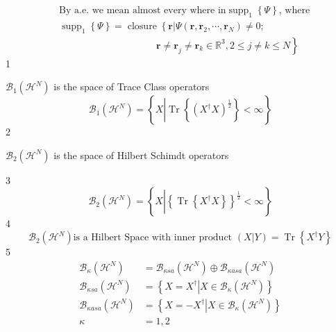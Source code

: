 \documentclass[prl,twocolumn]{revtex4}%
\begin{document}
%

\begin{align*}
&  \text{By a.e. we mean almost every where in}\operatorname*{supp}%
\nolimits_{1}\left\{  \Psi\right\}  \text{, where}\\
&  \operatorname*{supp}\nolimits_{1}\left\{  \Psi\right\}
=\operatorname*{closure}\left\{  \mathbf{r}\left\vert \Psi\left(
\mathbf{r},\mathbf{r}_{2},\cdots,\mathbf{r}_{N}\right)  \neq0;\right.
\right.  \\
&  \qquad\qquad\qquad\qquad\qquad\left.  \mathbf{r\neq r}_{j}\neq
\mathbf{r}_{k}\in\mathbb{R}^{3},2\leq j\neq k\leq N\right\}
\end{align*}
1

$\mathcal{B}_{1}\left(  \mathcal{H}^{N}\right)  $ is the space of Trace Class
operators
\[
\mathcal{B}_{1}\left(  \mathcal{H}^{N}\right)  =\left\{  X\left\vert
\operatorname{Tr}\left\{  \left(  X^{\dagger}X\right)  ^{\frac{1}{2}}\right\}
<\infty\right.  \right\}
\]
2

$\mathcal{B}_{2}\left(  \mathcal{H}^{N}\right)  $ is the space of Hilbert
Schimdt operators

3%
\[
\mathcal{B}_{2}\left(  \mathcal{H}^{N}\right)  =\left\{  X\left\vert \left\{
\operatorname{Tr}\left\{  X^{\dagger}X\right\}  \right\}  ^{\frac{1}{2}%
}<\infty\right.  \right\}
\]
4%
\[
\mathcal{B}_{2}\left(  \mathcal{H}^{N}\right)  \text{is a Hilbert Space with
inner product }\left(  X\left\vert Y\right.  \right)  =\operatorname{Tr}%
\left\{  X^{\dagger}Y\right\}
\]
5%
\begin{align*}
\mathcal{B}_{\kappa}\left(  \mathcal{H}^{N}\right)    & =\mathcal{B}_{\kappa
sa}\left(  \mathcal{H}^{N}\right)  \oplus\mathcal{B}_{\kappa asa}\left(
\mathcal{H}^{N}\right)  \\
\mathcal{B}_{\kappa sa}\left(  \mathcal{H}^{N}\right)    & =\left\{  \left.
X=X^{\dagger}\right\vert X\in\mathcal{B}_{\kappa}\left(  \mathcal{H}%
^{N}\right)  \right\}  \\
\mathcal{B}_{\kappa asa}\left(  \mathcal{H}^{N}\right)    & =\left\{  \left.
X=-X^{\dagger}\right\vert X\in\mathcal{B}_{\kappa}\left(  \mathcal{H}%
^{N}\right)  \right\}  \\
\kappa & =1,2
\end{align*}
\end{document}
